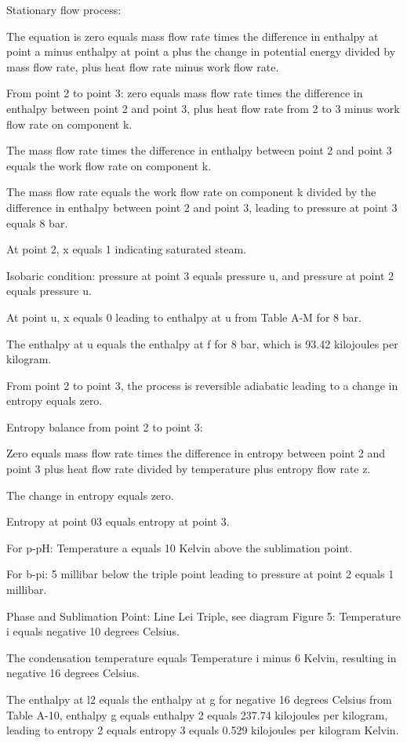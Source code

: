 Stationary flow process:

The equation is zero equals mass flow rate times the difference in enthalpy at point a minus enthalpy at point a plus the change in potential energy divided by mass flow rate, plus heat flow rate minus work flow rate.

From point 2 to point 3: zero equals mass flow rate times the difference in enthalpy between point 2 and point 3, plus heat flow rate from 2 to 3 minus work flow rate on component k.

The mass flow rate times the difference in enthalpy between point 2 and point 3 equals the work flow rate on component k.

The mass flow rate equals the work flow rate on component k divided by the difference in enthalpy between point 2 and point 3, leading to pressure at point 3 equals 8 bar.

At point 2, x equals 1 indicating saturated steam.

Isobaric condition: pressure at point 3 equals pressure u, and pressure at point 2 equals pressure u.

At point u, x equals 0 leading to enthalpy at u from Table A-M for 8 bar.

The enthalpy at u equals the enthalpy at f for 8 bar, which is 93.42 kilojoules per kilogram.

From point 2 to point 3, the process is reversible adiabatic leading to a change in entropy equals zero.

Entropy balance from point 2 to point 3:

Zero equals mass flow rate times the difference in entropy between point 2 and point 3 plus heat flow rate divided by temperature plus entropy flow rate z.

The change in entropy equals zero.

Entropy at point 03 equals entropy at point 3.

For p-pH: Temperature a equals 10 Kelvin above the sublimation point.

For b-pi: 5 millibar below the triple point leading to pressure at point 2 equals 1 millibar.

Phase and Sublimation Point: Line Lei Triple, see diagram Figure 5: Temperature i equals negative 10 degrees Celsius.

The condensation temperature equals Temperature i minus 6 Kelvin, resulting in negative 16 degrees Celsius.

The enthalpy at l2 equals the enthalpy at g for negative 16 degrees Celsius from Table A-10, enthalpy g equals enthalpy 2 equals 237.74 kilojoules per kilogram, leading to entropy 2 equals entropy 3 equals 0.529 kilojoules per kilogram Kelvin.

